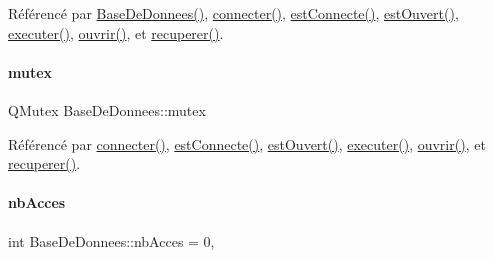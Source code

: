 Référencé par \hyperlink{class_base_de_donnees_a10dd177f1008f675ab78c2221b2a6750}{Base\+De\+Donnees()}, \hyperlink{class_base_de_donnees_ab2e092285ccc0ee1cce61a1774218561}{connecter()}, \hyperlink{class_base_de_donnees_a00388973f3ec42e5c8e76e7af7e124b2}{est\+Connecte()}, \hyperlink{class_base_de_donnees_af9ac332082ffd0dd35e412cefabe5e9c}{est\+Ouvert()}, \hyperlink{class_base_de_donnees_aa8de5f8f8bb17edc43f5c0ee33712081}{executer()}, \hyperlink{class_base_de_donnees_a7f6a5510b08017b0d99115a84252f186}{ouvrir()}, et \hyperlink{class_base_de_donnees_a77539baad389f5acf754cd2cd452403e}{recuperer()}.

\mbox{\label{class_base_de_donnees_aa1b4696fac87a740f914aa73739086f2}} 
\paragraph{\texorpdfstring{mutex}{mutex}}
{\footnotesize\ttfamily Q\+Mutex Base\+De\+Donnees\+::mutex\hspace{0.3cm}{\ttfamily [private]}}



Référencé par \hyperlink{class_base_de_donnees_ab2e092285ccc0ee1cce61a1774218561}{connecter()}, \hyperlink{class_base_de_donnees_a00388973f3ec42e5c8e76e7af7e124b2}{est\+Connecte()}, \hyperlink{class_base_de_donnees_af9ac332082ffd0dd35e412cefabe5e9c}{est\+Ouvert()}, \hyperlink{class_base_de_donnees_aa8de5f8f8bb17edc43f5c0ee33712081}{executer()}, \hyperlink{class_base_de_donnees_a7f6a5510b08017b0d99115a84252f186}{ouvrir()}, et \hyperlink{class_base_de_donnees_a77539baad389f5acf754cd2cd452403e}{recuperer()}.

\mbox{\label{class_base_de_donnees_a5099ecb2922bb31d84cd5d4505298a29}} 
\paragraph{\texorpdfstring{nb\+Acces}{nbAcces}}
{\footnotesize\ttfamily int Base\+De\+Donnees\+::nb\+Acces = 0\hspace{0.3cm}{\ttfamily [static]}, {\ttfamily [private]}}



